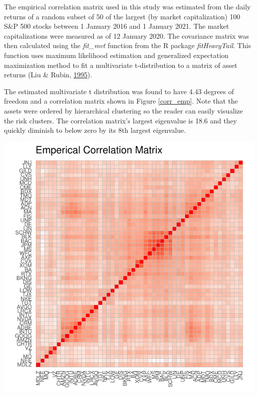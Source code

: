 \documentclass[11pt,preprint, authoryear]{elsarticle}
\let\origfigure\figure
\let\endorigfigure\endfigure
\renewenvironment{figure}[1][2] {
    \expandafter\origfigure\expandafter[H]
} {
    \endorigfigure
}
\numberwithin{equation}{section}
\numberwithin{figure}{section}
\numberwithin{table}{section}
\begin{document}
The empirical correlation matrix used in this study was estimated from
the daily returns of a random subset of 50 of the largest (by market
capitalization) 100 S\&P 500 stocks between 1 January 2016 and 1 January
2021. The market capitalizations were measured as of 12 January 2020.
The covariance matrix was then calculated using the \emph{fit\_mvt}
function from the R package \emph{fitHeavyTail}. This function uses
maximum likelihood estimation and generalized expectation maximization
method to fit a multivariate t-distribution to a matrix of asset returns
(Liu \& Rubin, \protect\hyperlink{ref-liu1995}{1995}).

The estimated multivariate t distribution was found to have 4.43 degrees
of freedom and a correlation matrix shown in Figure \ref{corr_emp}. Note
that the assets were ordered by hierarchical clustering so the reader
can easily visualize the risk clusters. The correlation matrix's largest
eigenvalue is 18.6 and they quickly diminish to below zero by its 8th
largest eigenvalue.

\begin{figure}
\centering
\includegraphics{Thesis_files/figure-latex/unnamed-chunk-1-1.pdf}
\caption{\label{corr_emp} Emperical Correlation Matrix}
\end{figure}
\end{document}
